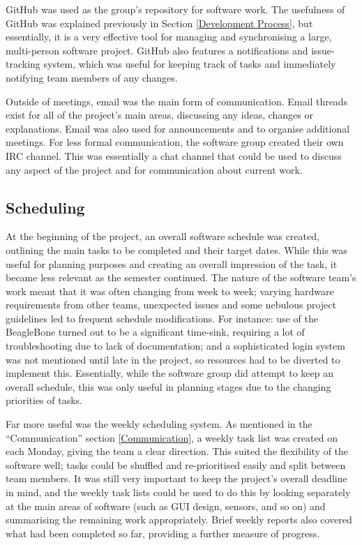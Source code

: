 GitHub was used as the group's repository for software work. The usefulness of GitHub was explained previously in Section \ref{Development Process}, but essentially, it is a very effective tool for managing and synchronising a large, multi-person software project. GitHub also features a notifications and issue-tracking system, which was useful for keeping track of tasks and immediately notifying team members of any changes.


Outside of meetings, email was the main form of communication. Email threads exist for all of the project's main areas, discussing any ideas, changes or explanations. Email was also used for announcements and to organise additional meetings. For less formal communication, the software group created their own IRC channel. This was essentially a chat channel that could be used to discuss any aspect of the project and for communication about current work.

\subsection{Scheduling}

At the beginning of the project, an overall software schedule was created, outlining the main tasks to be completed and their target dates. While this was useful for planning purposes and creating an overall impression of the task, it became less relevant as the semester continued. The nature of the software team's work meant that it was often changing from week to week; varying hardware requirements from other teams, unexpected issues and some nebulous project guidelines led to frequent schedule modifications. For instance: use of the BeagleBone turned out to be a significant time-sink, requiring a lot of troubleshooting due to lack of documentation; and a sophisticated login system was not mentioned until late in the project, so resources had to be diverted to implement this. Essentially, while the software group did attempt to keep an overall schedule, this was only useful in planning stages due to the changing priorities of tasks.


Far more useful was the weekly scheduling system. As mentioned in the ``Communication'' section \ref{Communication}, a weekly task list was created on each Monday, giving the team a clear direction. This suited the flexibility of the software well; tasks could be shuffled and re-prioritised easily and split between team members. It was still very important to keep the project's overall deadline in mind, and the weekly task lists could be used to do this by looking separately at the main areas of software (such as GUI design, sensors, and so on) and summarising the remaining work appropriately. Brief weekly reports also covered what had been completed so far, providing a further measure of progress.


